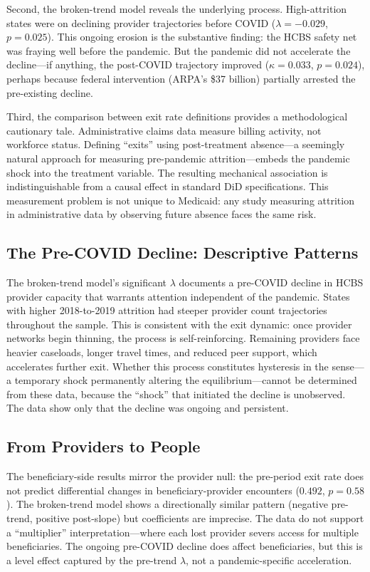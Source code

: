 \documentclass[12pt]{article}
\begin{document}
Second, the broken-trend model reveals the underlying process. High-attrition states were on declining provider trajectories before COVID ($\lambda = -0.029$, $p = 0.025$). This ongoing erosion is the substantive finding: the HCBS safety net was fraying well before the pandemic. But the pandemic did not accelerate the decline---if anything, the post-COVID trajectory improved ($\kappa = 0.033$, $p = 0.024$), perhaps because federal intervention (ARPA's \$37 billion) partially arrested the pre-existing decline.

Third, the comparison between exit rate definitions provides a methodological cautionary tale. Administrative claims data measure billing activity, not workforce status. Defining ``exits'' using post-treatment absence---a seemingly natural approach for measuring pre-pandemic attrition---embeds the pandemic shock into the treatment variable. The resulting mechanical association is indistinguishable from a causal effect in standard DiD specifications. This measurement problem is not unique to Medicaid: any study measuring attrition in administrative data by observing future absence faces the same risk.

\subsection{The Pre-COVID Decline: Descriptive Patterns}

The broken-trend model's significant $\lambda$ documents a pre-COVID decline in HCBS provider capacity that warrants attention independent of the pandemic. States with higher 2018-to-2019 attrition had steeper provider count trajectories throughout the sample. This is consistent with the \citet{hirschman1970} exit dynamic: once provider networks begin thinning, the process is self-reinforcing. Remaining providers face heavier caseloads, longer travel times, and reduced peer support, which accelerates further exit. Whether this process constitutes hysteresis in the \citet{blanchardsummers1986} sense---a temporary shock permanently altering the equilibrium---cannot be determined from these data, because the ``shock'' that initiated the decline is unobserved. The data show only that the decline was ongoing and persistent.

\subsection{From Providers to People}

The beneficiary-side results mirror the provider null: the pre-period exit rate does not predict differential changes in beneficiary-provider encounters ($0.492$, $p = 0.58$). The broken-trend model shows a directionally similar pattern (negative pre-trend, positive post-slope) but coefficients are imprecise. The data do not support a ``multiplier'' interpretation---where each lost provider severs access for multiple beneficiaries. The ongoing pre-COVID decline does affect beneficiaries, but this is a level effect captured by the pre-trend $\lambda$, not a pandemic-specific acceleration.
\end{document}
